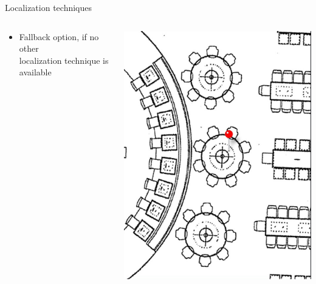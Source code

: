 \documentclass[11pt]{beamer}
\begin{document}
\begin{frame}{Localization techniques}
\begin{columns}
\begin{column}{0.65\textwidth}
      \begin{itemize}
        \item Fallback option, if no other\\localization technique is available
      \end{itemize}

    \end{column}

    \hfill
    \begin{column}{0.25\textwidth}
      \includegraphics[width=\textwidth]{manualpinpoint}
    \end{column}

  \end{columns}

\end{frame}
\end{document}
